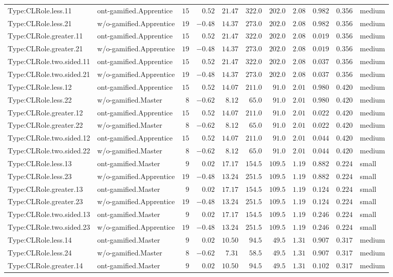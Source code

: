 \documentclass[6pt,a4paper]{article}
\begin{document}
{\begin{longtable}{llrrrrrrrrl}
Type:CLRole.less.11&ont-gamified.Apprentice&$15$&$ 0.52$&$21.47$&$322.0$&$202.0$&$2.08$&$0.982$&$0.356$&medium\tabularnewline
Type:CLRole.less.21&w/o-gamified.Apprentice&$19$&$-0.48$&$14.37$&$273.0$&$202.0$&$2.08$&$0.982$&$0.356$&medium\tabularnewline
Type:CLRole.greater.11&ont-gamified.Apprentice&$15$&$ 0.52$&$21.47$&$322.0$&$202.0$&$2.08$&$0.019$&$0.356$&medium\tabularnewline
Type:CLRole.greater.21&w/o-gamified.Apprentice&$19$&$-0.48$&$14.37$&$273.0$&$202.0$&$2.08$&$0.019$&$0.356$&medium\tabularnewline
Type:CLRole.two.sided.11&ont-gamified.Apprentice&$15$&$ 0.52$&$21.47$&$322.0$&$202.0$&$2.08$&$0.037$&$0.356$&medium\tabularnewline
Type:CLRole.two.sided.21&w/o-gamified.Apprentice&$19$&$-0.48$&$14.37$&$273.0$&$202.0$&$2.08$&$0.037$&$0.356$&medium\tabularnewline
Type:CLRole.less.12&ont-gamified.Apprentice&$15$&$ 0.52$&$14.07$&$211.0$&$ 91.0$&$2.01$&$0.980$&$0.420$&medium\tabularnewline
Type:CLRole.less.22&w/o-gamified.Master&$ 8$&$-0.62$&$ 8.12$&$ 65.0$&$ 91.0$&$2.01$&$0.980$&$0.420$&medium\tabularnewline
Type:CLRole.greater.12&ont-gamified.Apprentice&$15$&$ 0.52$&$14.07$&$211.0$&$ 91.0$&$2.01$&$0.022$&$0.420$&medium\tabularnewline
Type:CLRole.greater.22&w/o-gamified.Master&$ 8$&$-0.62$&$ 8.12$&$ 65.0$&$ 91.0$&$2.01$&$0.022$&$0.420$&medium\tabularnewline
Type:CLRole.two.sided.12&ont-gamified.Apprentice&$15$&$ 0.52$&$14.07$&$211.0$&$ 91.0$&$2.01$&$0.044$&$0.420$&medium\tabularnewline
Type:CLRole.two.sided.22&w/o-gamified.Master&$ 8$&$-0.62$&$ 8.12$&$ 65.0$&$ 91.0$&$2.01$&$0.044$&$0.420$&medium\tabularnewline
Type:CLRole.less.13&ont-gamified.Master&$ 9$&$ 0.02$&$17.17$&$154.5$&$109.5$&$1.19$&$0.882$&$0.224$&small\tabularnewline
Type:CLRole.less.23&w/o-gamified.Apprentice&$19$&$-0.48$&$13.24$&$251.5$&$109.5$&$1.19$&$0.882$&$0.224$&small\tabularnewline
Type:CLRole.greater.13&ont-gamified.Master&$ 9$&$ 0.02$&$17.17$&$154.5$&$109.5$&$1.19$&$0.124$&$0.224$&small\tabularnewline
Type:CLRole.greater.23&w/o-gamified.Apprentice&$19$&$-0.48$&$13.24$&$251.5$&$109.5$&$1.19$&$0.124$&$0.224$&small\tabularnewline
Type:CLRole.two.sided.13&ont-gamified.Master&$ 9$&$ 0.02$&$17.17$&$154.5$&$109.5$&$1.19$&$0.246$&$0.224$&small\tabularnewline
Type:CLRole.two.sided.23&w/o-gamified.Apprentice&$19$&$-0.48$&$13.24$&$251.5$&$109.5$&$1.19$&$0.246$&$0.224$&small\tabularnewline
Type:CLRole.less.14&ont-gamified.Master&$ 9$&$ 0.02$&$10.50$&$ 94.5$&$ 49.5$&$1.31$&$0.907$&$0.317$&medium\tabularnewline
Type:CLRole.less.24&w/o-gamified.Master&$ 8$&$-0.62$&$ 7.31$&$ 58.5$&$ 49.5$&$1.31$&$0.907$&$0.317$&medium\tabularnewline
Type:CLRole.greater.14&ont-gamified.Master&$ 9$&$ 0.02$&$10.50$&$ 94.5$&$ 49.5$&$1.31$&$0.102$&$0.317$&medium\tabularnewline

\end{longtable}}
\end{document}
